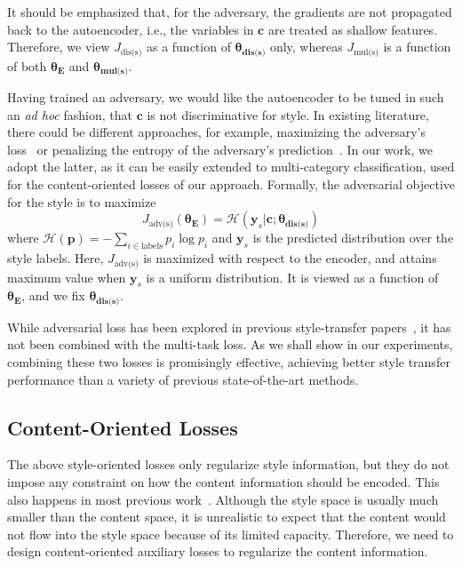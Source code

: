 \documentclass[letterpaper]{article} %
\newcommand{\loss}[1]{J_{\text{#1}}}
\newcommand{\nnweight}[1]{\bm{\theta_{\text{#1}}}}
\begin{document}
It should be emphasized that, for the adversary, the gradients are not propagated back to the autoencoder, i.e., the variables in $\bm c$ are treated as shallow features. Therefore, we view $\loss{dis(s)}$ as a function of $\nnweight{dis(s)}$ only, whereas $\loss{mul(s)}$ is a function of both $\nnweight{E}$ and $\nnweight{mul(s)}$.

Having trained an adversary, we would like the autoencoder to be tuned in such an \textit{ad hoc} fashion, that $\bm c$ is not discriminative for style.
In existing literature, there could be different approaches, for example, maximizing the adversary's loss~\cite{shen2017style,zhao2018adversarially} or penalizing the entropy of the adversary's prediction~\cite{fu2018style}.
In our work, we adopt the latter, as it can be easily extended to multi-category classification, used for the content-oriented losses of our approach. Formally, the adversarial objective for the style is to maximize
\begin{equation} \label{eqn:advs}
	\loss{adv(s)}(\nnweight{E})=\mathcal{H}(\bm y_s|\bm c; \nnweight{dis(s)})
\end{equation}
where $\mathcal{H}(\bm p)=-\sum_{i\in\text{labels}}p_i\log p_i$ and $\bm y_s$ is the predicted distribution over the style labels. Here, $\loss{adv(s)}$ is maximized with respect to the encoder, and attains maximum value when $\bm y_s$ is a uniform distribution. It is viewed as a function of $\nnweight{E}$, and we fix $\nnweight{dis(s)}$.

While adversarial loss has been explored in previous style-transfer papers~\cite{shen2017style,fu2018style}, it has not been combined with the multi-task loss. As we shall show in our experiments, combining these two losses is promisingly effective, achieving better style transfer performance than a variety of previous state-of-the-art methods.

\subsection{Content-Oriented Losses}

The above style-oriented losses only regularize style information, but they do not impose any constraint on how the content information should be encoded. This also happens in most previous work~\cite{hu2017toward,shen2017style,fu2018style}.
Although the style space is usually much smaller than the content space, it is unrealistic to expect that the content would not flow into the style space because of its limited capacity. Therefore, we need to design content-oriented auxiliary losses to regularize the content information.
\end{document}
